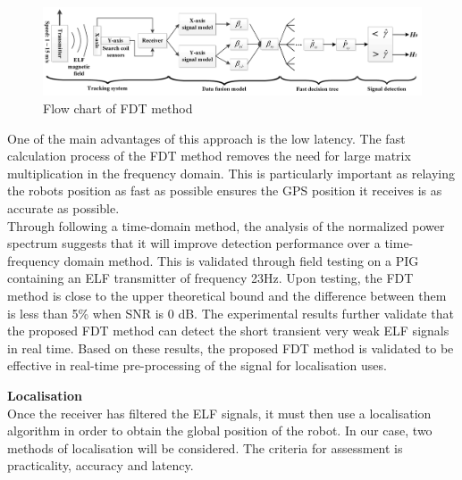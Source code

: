 \documentclass[11pt]{article}		%
\begin{document}
         \begin{figure}[h]
			\centering
			\includegraphics[scale=0.12]{FDT.png}
			\caption{Flow chart of FDT method } %
			\label{FDTFlowcahrt}
		\end{figure}
		
		One of the main advantages of this approach is the low latency. 
		The fast calculation process of the FDT method removes the need for large matrix multiplication in the frequency domain. 
		This is particularly important as relaying the robots position as fast as possible ensures the GPS position it receives is as accurate as possible. 
		\\
    	\hspace*{3ex}Through following a time-domain method, the analysis of the normalized power spectrum suggests that it will improve detection performance over a time-frequency domain method. 
    	This is validated through field testing on a PIG containing an ELF transmitter of frequency 23Hz. 
    	Upon testing, the FDT method is close to the upper theoretical bound and the difference between them is less than 5\%  when SNR is 0 dB.
    	The experimental results further validate that the proposed FDT method can detect the short transient very weak ELF signals in real time. 
    	Based on these results, the proposed FDT method is validated to be effective in real-time pre-processing of the signal for localisation uses.
		
		\textbf{Localisation}\\
		Once the receiver has filtered the ELF signals, it must then use a localisation algorithm in order to obtain the global position of the robot. In our case, two methods of localisation will be considered. The criteria for assessment is practicality, accuracy and latency. 
		
\end{document}

